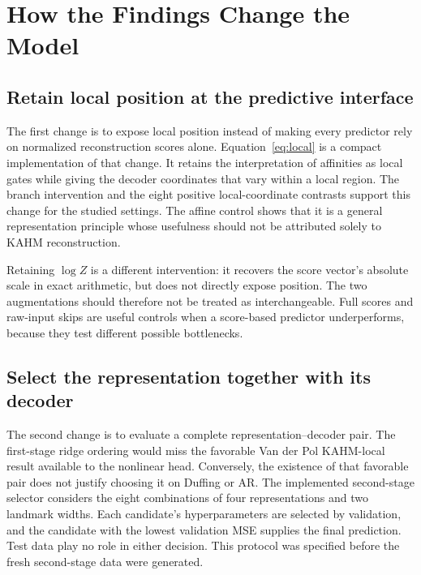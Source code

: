 \documentclass[10pt]{article}
\begin{document}
\begin{table}[t]
 \caption{Secondary Airfoil static-regression results on one fixed group
 split, averaged over 24 fitting seeds. Units are dB$^2$. These seeds do
 not constitute independent natural-data replications, and the comparison
 is descriptive.}
 \label{tab:airfoil}
 \centering\small
 
\end{table}

\section{How the Findings Change the Model}\label{sec:implications}

\subsection{Retain local position at the predictive interface}

The first change is to expose local position instead of making every
predictor rely on normalized reconstruction scores alone. Equation~\eqref{eq:local}
is a compact implementation of that change. It retains the interpretation
of affinities as local gates while giving the decoder coordinates that
vary within a local region. The branch intervention and the eight positive
local-coordinate contrasts support this change for the studied settings.
The affine control shows that it is a general representation principle
whose usefulness should not be attributed solely to KAHM reconstruction.

Retaining $\log Z$ is a different intervention: it recovers the score vector's
absolute scale in exact arithmetic, but does not directly expose position.
The two augmentations should therefore not be treated as interchangeable.
Full scores and raw-input skips are useful controls when a score-based
predictor underperforms, because they test different possible bottlenecks.

\subsection{Select the representation together with its decoder}

The second change is to evaluate a complete representation--decoder pair.
The first-stage ridge ordering would miss the favorable Van der Pol
KAHM-local result available to the nonlinear head. Conversely, the existence
of that favorable pair does not justify choosing it on Duffing or AR.
The implemented second-stage selector considers the eight combinations
of four representations and two landmark widths. Each candidate's
hyperparameters are selected by validation, and the candidate with the
lowest validation MSE supplies the final prediction. Test data play no
role in either decision. This protocol was specified before the fresh
second-stage data were generated.
\end{document}
